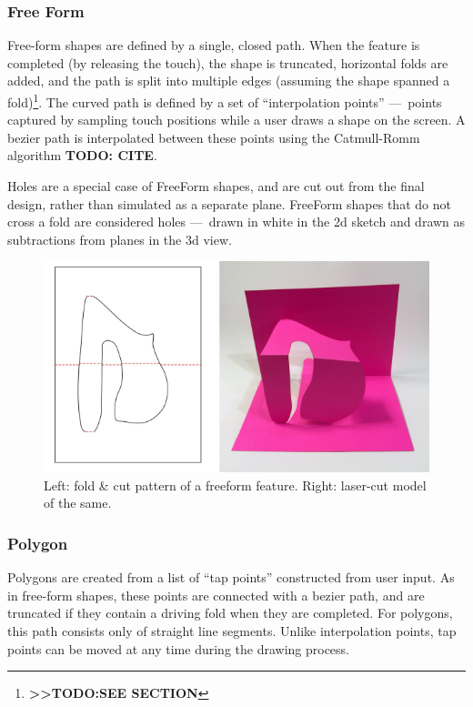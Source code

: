\subsubsection{Free Form}\label{free-form}

Free-form shapes are defined by a single, closed path. When the feature
is completed (by releasing the touch), the shape is truncated,
horizontal folds are added, and the path is split into multiple edges
(assuming the shape spanned a fold)\footnote{\textbf{\textgreater{}\textgreater{}TODO:SEE
  SECTION}}. The curved path is defined by a set of ``interpolation
points'' ---~points captured by sampling touch positions while a user
draws a shape on the screen. A bezier path is interpolated between these
points using the Catmull-Romm algorithm \textbf{TODO: CITE}.

Holes are a special case of FreeForm shapes, and are cut out from the
final design, rather than simulated as a separate plane. FreeForm shapes
that do not cross a fold are considered holes ---~drawn in white in the
2d sketch and drawn as subtractions from planes in the 3d view.

\begin{figure}[htbp]
\centering
\includegraphics{figures/33_UI_Interface_Data_Structures/free.pdf}
\caption{Left: fold \& cut pattern of a freeform feature. Right:
laser-cut model of the same.}
\end{figure}

\subsubsection{Polygon}\label{polygon}

Polygons are created from a list of ``tap points'' constructed from user
input. As in free-form shapes, these points are connected with a bezier
path, and are truncated if they contain a driving fold when they are
completed. For polygons, this path consists only of straight line
segments. Unlike interpolation points, tap points can be moved at any
time during the drawing process.

